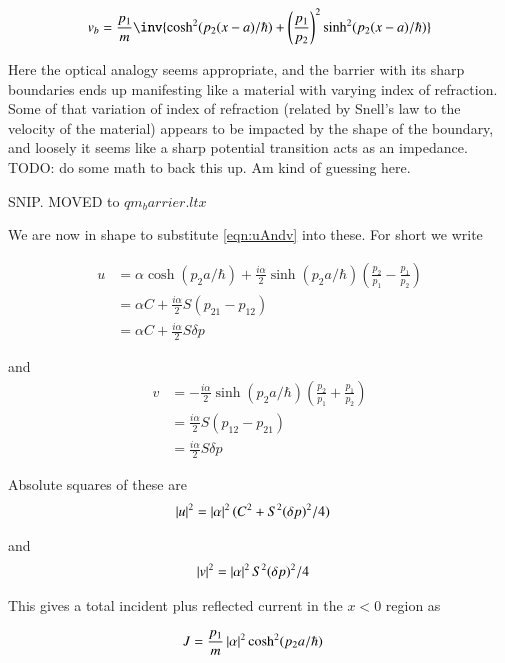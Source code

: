 \documentclass{article}
\begin{document}
\begin{align*}
v_b = \frac{p_1}{m} \inv{
\cosh^2(p_2(x-a)/\hbar)
 + 
 {\left(\frac{p_1}{p_2}\right)}^2
\sinh^2(p_2(x-a)/\hbar)
 } \\
\end{align*}

Here the optical analogy seems appropriate, and the barrier with its sharp
boundaries ends up manifesting like a material with varying index of
refraction.  Some of that variation of index of refraction (related by Snell's
law to the velocity of the material) appears to be impacted by the shape of
the boundary, and loosely it seems like a sharp potential transition acts
as an impedance.  TODO: do some math to back this up.  Am kind of guessing
here.

SNIP.  MOVED to $qm_barrier.ltx$

We are now in shape to substitute \ref{eqn:uAndv} into these.  For short we
write

\begin{align*}
u 
&= \alpha \cosh( p_2 a/\hbar )  + \frac{i\alpha}{2} \sinh( p_2 a /\hbar ) \left( \frac{p_2}{p_1} -  \frac{p_1}{p_2} \right) \\
&= \alpha C + \frac{i\alpha}{2} S \left( p_{21} - p_{12} \right) \\
&= \alpha C + \frac{i\alpha}{2} S \delta p
\end{align*}

and
\begin{align*}
v 
&= - \frac{i\alpha}{2} \sinh( p_2 a /\hbar ) \left( \frac{p_2}{p_1} + \frac{p_1}{p_2} \right) \\
&= \frac{i\alpha}{2} S \left( p_{12} - p_{21} \right) \\
&= \frac{i\alpha}{2} S \delta p
\end{align*}

Absolute squares of these are
\begin{align*}
\left\lvert{u}\right\rvert^2 &= \left\lvert{\alpha}\right\rvert^2 (C^2 + S^2 (\delta p)^2/4)
\end{align*}

and
\begin{align*}
\left\lvert{v}\right\rvert^2 &= \left\lvert{\alpha}\right\rvert^2 S^2 (\delta p)^2/4
\end{align*}

This gives a total incident plus reflected current in the $x<0$ region as

\begin{align}\label{eqn:jTotBarrier}
J 
&=
\frac{p_1}{m} \left\lvert{\alpha}\right\rvert^2 \cosh^2(p_2 a/\hbar)
\end{align}
\end{document}
